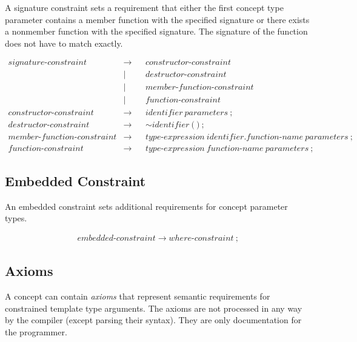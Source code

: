 \documentclass[a4paper,oneside,11pt]{article}
\begin{document}
A signature constraint sets a requirement that either the first concept type parameter contains a member function with the specified signature or there exists a nonmember function with the specified signature.
The signature of the function does not have to match exactly.

\begin{align*}
signature\textrm{-}constraint &\rightarrow & &constructor\textrm{-}constraint\\
&| & &destructor\textrm{-}constraint\\
&| & &member\textrm{-}function\textrm{-}constraint\\
&| & &function\textrm{-}constraint\\
constructor\textrm{-}constraint &\rightarrow & &\hyperref[identifier]{identifier} \> \hyperref[parameters]{parameters} \> \texttt{;}\\
destructor\textrm{-}constraint &\rightarrow & &\sim \hyperref[identifier]{identifier} \> \texttt{(} \> \texttt{)} \> \texttt{;}\\
member\textrm{-}function\textrm{-}constraint &\rightarrow & &\hyperref[typeexpr]{type\textrm{-}expression} \>
\hyperref[identifier]{identifier} \texttt{.} \hyperref[functionname]{function\textrm{-}name} \> \hyperref[parameters]{parameters} \> \texttt{;}\\
function\textrm{-}constraint &\rightarrow & &\hyperref[typeexpr]{type\textrm{-}expression} \> \hyperref[functionname]{function\textrm{-}name} \>
\hyperref[parameters]{parameters} \>\texttt{;}
\end{align*}

\subsection{Embedded Constraint}\label{embeddedconstraint}

An embedded constraint sets additional requirements for concept parameter types.

\begin{align*}
embedded\textrm{-}constraint \rightarrow \hyperref[whereconstraint]{where\textrm{-}constraint} \> \texttt{;}
\end{align*}

\subsection{Axioms}\label{axiom}

A concept can contain \emph{axioms} that represent semantic requirements for constrained template type arguments.
The axioms are not processed in any way by the compiler (except parsing their syntax).
They are only documentation for the programmer.
\end{document}
